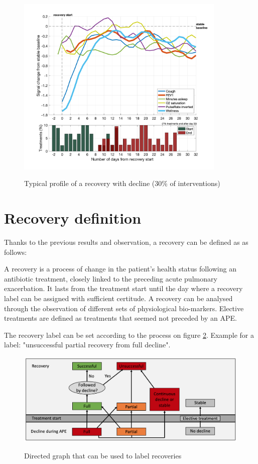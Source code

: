 \begin{figure}[!h]
    \caption{Typical profile of a recovery with decline (30\% of interventions)}
    \centering
    \includegraphics[width=100mm]{images/profile_fail.png}
    \label{fig:fail}
\end{figure}

\section{Recovery definition}
Thanks to the previous results and observation, a recovery can be defined as as follows: 

 A recovery is a process of change in the patient's health status following an antibiotic treatment, closely linked to the preceding acute pulmonary exacerbation. It lasts from the treatment start until the day where a recovery label can be assigned with sufficient certitude. A recovery can be analysed through the observation of different sets of physiological bio-markers. Elective treatments are defined as treatments that seemed not preceded by an APE.

The recovery label can be set according to the process on figure \ref{fig:types}. Example for a label: "unsuccessful partial recovery from full decline".

\begin{figure}[!h]
    \caption{Directed graph that can be used to label recoveries}
    \centering
    \includegraphics[width=130mm]{images/types.png}
    \label{fig:types}
\end{figure}



